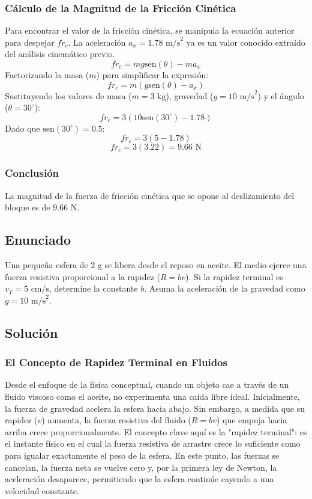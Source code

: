 \documentclass[12pt]{article}
\begin{document}
\subsubsection*{Cálculo de la Magnitud de la Fricción Cinética}
Para encontrar el valor de la fricción cinética, se manipula la ecuación anterior para despejar $fr_c$. La aceleración $a_x = 1.78 \text{ m/s}^2$ ya es un valor conocido extraído del análisis cinemático previo.
$$fr_c = mg\text{sen}(\theta) - ma_x$$
Factorizando la masa ($m$) para simplificar la expresión:
$$fr_c = m(g\text{sen}(\theta) - a_x)$$
Sustituyendo los valores de masa ($m = 3 \text{ kg}$), gravedad ($g = 10 \text{ m/s}^2$) y el ángulo ($\theta = 30^\circ$):
$$fr_c = 3(10\text{sen}(30^\circ) - 1.78)$$
Dado que $\text{sen}(30^\circ) = 0.5$:
$$fr_c = 3(5 - 1.78)$$
$$fr_c = 3(3.22) = 9.66 \text{ N}$$

\subsubsection*{Conclusión}
La magnitud de la fuerza de fricción cinética que se opone al deslizamiento del bloque es de $9.66 \text{ N}$.

\newpage

\subsection*{Enunciado}
Una pequeña esfera de 2 g se libera desde el reposo en aceite. El medio ejerce una fuerza resistiva proporcional a la rapidez ($R = bv$). Si la rapidez terminal es $v_T = 5 \text{ cm/s}$, determine la constante $b$. Asuma la aceleración de la gravedad como $g = 10 \text{ m/s}^2$.

\subsection*{Solución}

\subsubsection*{El Concepto de Rapidez Terminal en Fluidos}
Desde el enfoque de la física conceptual, cuando un objeto cae a través de un fluido viscoso como el aceite, no experimenta una caída libre ideal. Inicialmente, la fuerza de gravedad acelera la esfera hacia abajo. Sin embargo, a medida que su rapidez ($v$) aumenta, la fuerza resistiva del fluido ($R = bv$) que empuja hacia arriba crece proporcionalmente. El concepto clave aquí es la "rapidez terminal": es el instante físico en el cual la fuerza resistiva de arrastre crece lo suficiente como para igualar exactamente el peso de la esfera. En este punto, las fuerzas se cancelan, la fuerza neta se vuelve cero y, por la primera ley de Newton, la aceleración desaparece, permitiendo que la esfera continúe cayendo a una velocidad constante.
\end{document}

